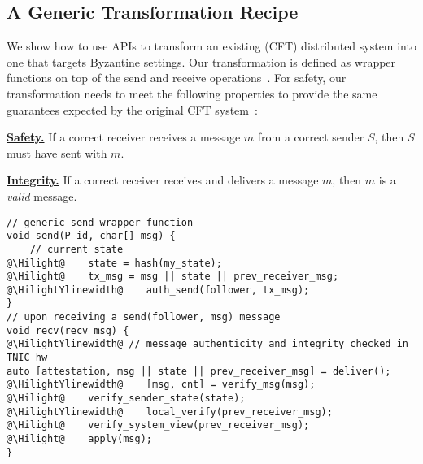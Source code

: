\subsection{A Generic Transformation Recipe}
\label{subsec:transformation}
We show how to use \projecttitle{} APIs to transform an existing (CFT) distributed system into one that targets Byzantine settings. Our transformation is defined as wrapper functions on top of the send and receive operations~\cite{clement2012}. For safety, our transformation needs to meet the following properties to provide the same guarantees expected by the original CFT system~\cite{clement2012, making_distributed_app_rob, 268272}:

\noindent\underline{{\bf{Safety.}}} If a correct receiver receives a message $m$ from a correct sender $S$, then $S$ must have sent with $m$.

\noindent\underline{{\bf{Integrity.}}} If a correct receiver receives and delivers a message $m$, then $m$ is a {\em valid} message.

{\small
\begin{lstlisting}[frame=h,style=customc,
                    label={lst:transformation},
                    caption= Generic application send and recv wrapper functions for transformation using \projecttitle{}: blue sections (native) and orange sections (\projecttitle additions).]
// generic send wrapper function
void send(P_id, char[] msg) {
    // current state
@\Hilight@    state = hash(my_state);
@\Hilight@    tx_msg = msg || state || prev_receiver_msg;
@\HilightYlinewidth@    auth_send(follower, tx_msg);
}
// upon receiving a send(follower, msg) message
void recv(recv_msg) {
@\HilightYlinewidth@ // message authenticity and integrity checked in TNIC hw
auto [attestation, msg || state || prev_receiver_msg] = deliver();
@\HilightYlinewidth@    [msg, cnt] = verify_msg(msg);
@\Hilight@    verify_sender_state(state);
@\HilightYlinewidth@    local_verify(prev_receiver_msg);
@\Hilight@    verify_system_view(prev_receiver_msg);
@\Hilight@    apply(msg);
}
\end{lstlisting}
}
\fi

